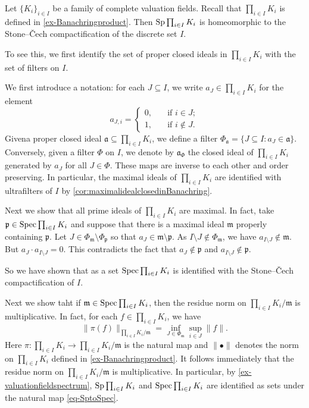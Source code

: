 \begin{example}\label{ex-prodvalufield}
    Let $\{K_i\}_{i\in I}$ be a family of complete valuation fields. Recall that $\prod_{i\in I} K_i$ is defined in \cref{ex-Banachringproduct}. Then $\operatorname{Sp} \prod_{i\in I} K_i$ is homeomorphic to the Stone--\v{C}ech compactification of the discrete set $I$.

    To see this, we first identify the set of proper closed ideals in $\prod_{i\in I} K_i$ with the set of filters on $I$. 
    
    We first introduce a notation: for each $J\subseteq I$, we write $a_J\in \prod_{i\in I} K_i$ for the element 
    \[
        a_{J,i}=\left\{
            \begin{aligned}
                0,&\quad \text{if }i\in J;\\
                1,&\quad \text{if }i\not\in J.
            \end{aligned}
        \right.  
    \]
    Givena proper closed ideal $\mathfrak{a}\subseteq \prod_{i\in I} K_i$, we define a filter $\Phi_{\mathfrak{a}}=\{J\subseteq I:a_J\in \mathfrak{a}\}$. Conversely, given a filter $\Phi$ on $I$, we denote by $\mathfrak{a}_{\Phi}$ the closed ideal of $\prod_{i\in I} K_i$ generated by $a_J$ for all $J\in \Phi$. These maps are inverse to each other and order preserving. In particular, the maximal ideals of $\prod_{i\in I} K_i$ are identified with ultrafilters of $I$ by \cref{cor:maximalidealclosedinBanachring}.

    Next we show that all prime ideals of $\prod_{i\in I} K_i$ are maximal. In fact, take $\mathfrak{p}\in \operatorname{Spec} \prod_{i\in I} K_i$ and suppose that there is a maximal ideal $\mathfrak{m}$ properly containing $\mathfrak{p}$. Let $J\in \Phi_{\mathfrak{m}}\setminus \Phi_{\mathfrak{p}}$ so that $a_J\in \mathfrak{m} \setminus \mathfrak{p}$. As $I\setminus J\not\in \Phi_{\mathfrak{m}}$, we have $a_{I\setminus J}\not\in \mathfrak{m}$. But $a_J\cdot a_{I\setminus J}=0$. This contradicts the fact that $a_J\not\in \mathfrak{p}$ and $a_{I\setminus J}\not\in \mathfrak{p}$.

    So we have shown that as a set $\operatorname{Spec} \prod_{i\in I} K_i$ is identified with the Stone--\v{C}ech compactification of $I$. 

    Next we show taht if $\mathfrak{m}\in \operatorname{Spec} \prod_{i\in I} K_i$, then the residue norm on $\prod_{i\in I} K_i/\mathfrak{m}$ is multiplicative. In fact, for each $f\in \prod_{i\in I} K_i$, we have
    \[
        \|\pi(f)\|_{\prod_{i\in I} K_i/\mathfrak{m}}=\inf_{J\in \Phi_{\mathfrak{m}}}\sup_{i\in J}\|f\|.
    \]
    Here $\pi:\prod_{i\in I} K_i\rightarrow \prod_{i\in I} K_i/\mathfrak{m}$ is the natural map and 
     $\|\bullet\|$ denotes the norm on $\prod_{i\in I} K_i$ defined in \cref{ex-Banachringproduct}. It follows immediately that the residue norm on $\prod_{i\in I} K_i/\mathfrak{m}$ is multiplicative. In particular, by \cref{ex-valuationfieldspectrum}, $\operatorname{Sp} \prod_{i\in I} K_i$ and $\operatorname{Spec} \prod_{i\in I} K_i$ are identified as sets under the natural map \eqref{eq-SptoSpec}.


\end{example}

